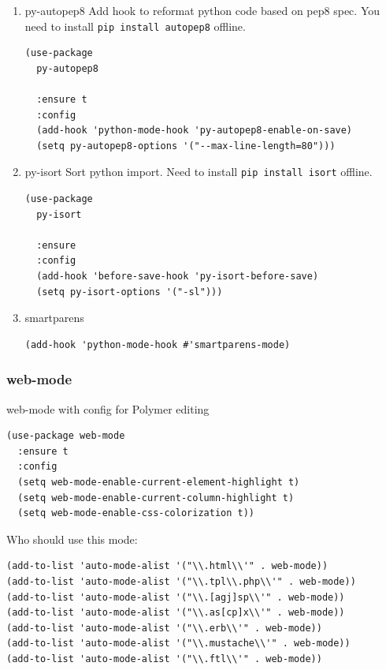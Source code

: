 \documentclass[11pt]{article}
\begin{document}
\begin{enumerate}
\item py-autopep8
\label{sec:org9ed82f8}
Add hook to reformat python code based on pep8 spec. You need to
install \texttt{pip install autopep8} offline.

\begin{verbatim}
(use-package
  py-autopep8

  :ensure t
  :config
  (add-hook 'python-mode-hook 'py-autopep8-enable-on-save)
  (setq py-autopep8-options '("--max-line-length=80")))
\end{verbatim}
\item py-isort
\label{sec:org0b4be65}
Sort python import. Need to install \texttt{pip install isort} offline.

\begin{verbatim}
(use-package
  py-isort

  :ensure
  :config
  (add-hook 'before-save-hook 'py-isort-before-save)
  (setq py-isort-options '("-sl")))
\end{verbatim}
\item smartparens
\label{sec:orge4bf277}
\begin{verbatim}
(add-hook 'python-mode-hook #'smartparens-mode)
\end{verbatim}
\end{enumerate}
\subsubsection{web-mode}
\label{sec:org263febc}
web-mode with config for Polymer editing
\begin{verbatim}
(use-package web-mode
  :ensure t
  :config
  (setq web-mode-enable-current-element-highlight t)
  (setq web-mode-enable-current-column-highlight t)
  (setq web-mode-enable-css-colorization t))
\end{verbatim}

Who should use this mode:
\begin{verbatim}
(add-to-list 'auto-mode-alist '("\\.html\\'" . web-mode))
(add-to-list 'auto-mode-alist '("\\.tpl\\.php\\'" . web-mode))
(add-to-list 'auto-mode-alist '("\\.[agj]sp\\'" . web-mode))
(add-to-list 'auto-mode-alist '("\\.as[cp]x\\'" . web-mode))
(add-to-list 'auto-mode-alist '("\\.erb\\'" . web-mode))
(add-to-list 'auto-mode-alist '("\\.mustache\\'" . web-mode))
(add-to-list 'auto-mode-alist '("\\.ftl\\'" . web-mode))
\end{verbatim}
\end{document}
